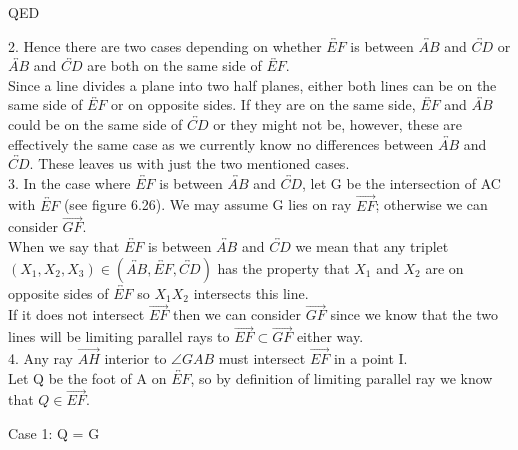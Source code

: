 \documentclass[12pt,letterpaper]{article}
\newcommand{\QED}{\begin{flushright}QED\end{flushright}}
\begin{document}
\QED




2. Hence there are two cases depending on whether $\overleftrightarrow{EF}$ is between $\overleftrightarrow{AB}$ and $\overleftrightarrow{CD}$ or $\overleftrightarrow{AB}$ and $\overleftrightarrow{CD}$ are both on the same side of $\overleftrightarrow{EF}$.\\

Since a line divides a plane into two half planes, either both lines can be on the same side of $\overleftrightarrow{EF}$ or on opposite sides.  If they are on the same side, $\overleftrightarrow{EF}$ and $\overleftrightarrow{AB}$ could be on the same side of $\overleftrightarrow{CD}$ or they might not be, however, these are effectively the same case as we currently know no differences between $\overleftrightarrow{AB}$ and $\overleftrightarrow{CD}$.  These leaves us with just the two mentioned cases.\\



3. In the case where $\overleftrightarrow{EF}$ is between $\overleftrightarrow{AB}$ and $\overleftrightarrow{CD}$, let G be the intersection of AC with $\overleftrightarrow{EF}$ (see figure 6.26).  We may assume G lies on ray $\overrightarrow{EF}$; otherwise we can consider $\overrightarrow{GF}$.\\

When we say that $\overleftrightarrow{EF}$ is between $\overleftrightarrow{AB}$ and $\overleftrightarrow{CD}$ we mean that any triplet $(X_1,X_2,X_3) \in (\overleftrightarrow{AB},\overleftrightarrow{EF},\overleftrightarrow{CD})$ has the property that $X_1$ and $X_2$ are on opposite sides of $\overleftrightarrow{EF}$ so $X_1 X_2$ intersects this line. \\

If it does not intersect $\overrightarrow{EF}$ then we can consider $\overrightarrow{GF}$ since we know that the two lines will be limiting parallel rays to $\overrightarrow{EF} \subset \overrightarrow{GF}$ either way.\\




4. Any ray $\overrightarrow{AH}$ interior to $\angle GAB$ must intersect $\overrightarrow{EF}$ in a point I.\\

Let Q be the foot of A on $\overleftrightarrow{EF}$, so by definition of limiting parallel ray we know that $Q \in \overrightarrow{EF}$.  

\noindent Case 1: Q = G\\
\end{document}
